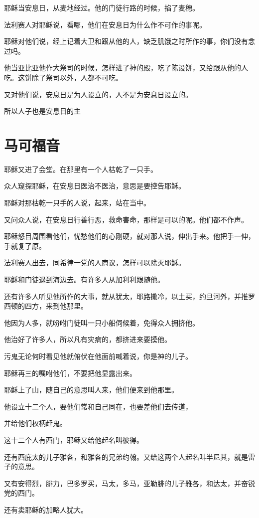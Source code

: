 \documentclass[12pt,oneside]{book}
\begin{document}
耶稣当安息日，从麦地经过。他的门徒行路的时候，掐了麦穗。

法利赛人对耶稣说，看哪，他们在安息日为什么作不可作的事呢。

耶稣对他们说，经上记着大卫和跟从他的人，缺乏肌饿之时所作的事，你们没有念过吗。

他当亚比亚他作大祭司的时候，怎样进了神的殿，吃了陈设饼，又给跟从他的人吃。这饼除了祭司以外，人都不可吃。

又对他们说，安息日是为人设立的，人不是为安息日设立的。

所以人子也是安息日的主

\chapter{马可福音}
耶稣又进了会堂。在那里有一个人枯乾了一只手。

众人窥探耶稣，在安息日医治不医治，意思是要控告耶稣。

耶稣对那枯乾一只手的人说，起来，站在当中。

又问众人说，在安息日行善行恶，救命害命，那样是可以的呢。他们都不作声。

耶稣怒目周围看他们，忧愁他们的心刚硬，就对那人说，伸出手来。他把手一伸，手就复了原。

法利赛人出去，同希律一党的人商议，怎样可以除灭耶稣。

耶稣和门徒退到海边去。有许多人从加利利跟随他。

还有许多人听见他所作的大事，就从犹太，耶路撒冷，以土买，约旦河外，并推罗西顿的四方，来到他那里。

他因为人多，就吩咐门徒叫一只小船伺候着，免得众人拥挤他。

他治好了许多人，所以凡有灾病的，都挤进来要摸他。

污鬼无论何时看见他就俯伏在他面前喊着说，你是神的儿子。

耶稣再三的嘱咐他们，不要把他显露出来。

耶稣上了山，随自己的意思叫人来，他们便来到他那里。

他设立十二个人，要他们常和自己同在，也要差他们去传道，

并给他们权柄赶鬼。

这十二个人有西门，耶稣又给他起名叫彼得。

还有西庇太的儿子雅各，和雅各的兄弟约翰。又给这两个人起名叫半尼其，就是雷子的意思。

又有安得烈，腓力，巴多罗买，马太，多马，亚勒腓的儿子雅各，和达太，并奋锐党的西门。

还有卖耶稣的加略人犹大。
\end{document}
